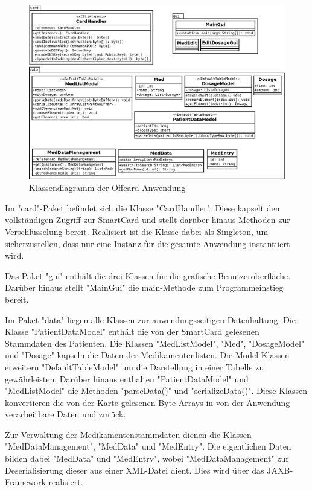 \documentclass[parskip]{scrartcl}
\begin{document}
		\begin{figure}[H]
			\centering
			\includegraphics[width=\linewidth]{./klassendiagramm.png}
			\caption{Klassendiagramm der Offcard-Anwendung}
			\label{fig:classdiagramm}
		\end{figure}
		
		Im "card"-Paket befindet sich die Klasse "CardHandler". Diese kapselt den vollständigen Zugriff zur SmartCard und stellt darüber hinaus Methoden zur Verschlüsselung bereit. Realisiert ist die Klasse dabei als Singleton, um sicherzustellen, dass nur eine Instanz für die gesamte Anwendung instantiiert wird.
		
		Das Paket "gui" enthält die drei Klassen für die grafische Benutzeroberfläche. Darüber hinaus stellt "MainGui" die main-Methode zum Programmeinstieg bereit.
		
		Im Paket "data" liegen alle Klassen zur anwendungsseitigen Datenhaltung. Die Klasse "PatientDataModel" enthält die von der SmartCard gelesenen Stammdaten des Patienten. Die Klassen "MedListModel", "Med", "DosageModel" und "Dosage" kapseln die Daten der Medikamentenlisten. Die Model-Klassen erweitern "DefaultTableModel" um die Darstellung in einer Tabelle zu gewährleisten. Darüber hinaus enthalten "PatientDataModel" und "MedListModel" die Methoden "parseData()" und "serializeData()". Diese Klassen konvertieren die von der Karte gelesenen Byte-Arrays in von der Anwendung verarbeitbare Daten und zurück. 
		
		Zur Verwaltung der Medikamentenstammdaten dienen die Klassen "MedDataManagement", "MedData" und "MedEntry". Die eigentlichen Daten bilden dabei "MedData" und "MedEntry", wobei "MedDataManagement" zur Deserialisierung dieser aus einer XML-Datei dient. Dies wird über das JAXB-Framework realisiert.
	
\end{document}
